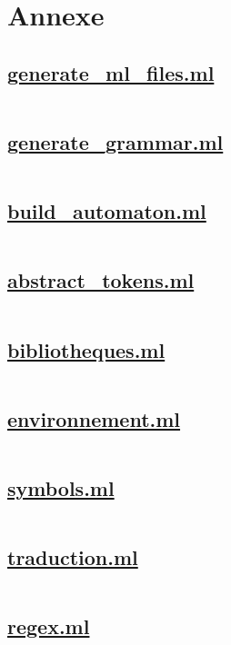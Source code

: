 \section{Annexe}


\subsection{\url{generate_ml_files.ml}}
\inputminted[]{ocaml}{../../src/preprocessing/generate_ml_files.ml}
\pagebreak
\subsection{\url{generate_grammar.ml}}
\inputminted[]{ocaml}{../../src/preprocessing/generate_grammar.ml}
\pagebreak
\subsection{\url{build_automaton.ml}}
\inputminted[]{ocaml}{../../src/prebuild/build_automaton.ml}
\pagebreak
\subsection{\url{abstract_tokens.ml}}
\inputminted[]{ocaml}{../../src/abstract_tokens.ml}
\pagebreak
\subsection{\url{bibliotheques.ml}}
\inputminted[]{ocaml}{../../src/bibliotheques.ml}
\pagebreak
\subsection{\url{environnement.ml}}
\inputminted[]{ocaml}{../../src/environnement.ml}
\pagebreak
\subsection{\url{symbols.ml}}
\inputminted[]{ocaml}{../../src/symbols.ml}
\pagebreak
\subsection{\url{traduction.ml}}
\inputminted[]{ocaml}{../../src/traduction.ml}
\pagebreak
\subsection{\url{regex.ml}}
\inputminted[]{ocaml}{../../src/regex.ml}
\pagebreak
